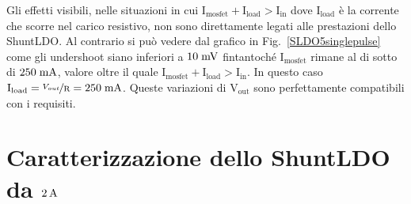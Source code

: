 Gli effetti visibili, nelle situazioni in cui $\mathrm{I_{mosfet} + I_{load} > I_{in}}$ dove $\mathrm{I_{load}}$ è la corrente che scorre nel carico resistivo, non sono direttamente legati alle prestazioni dello ShuntLDO. Al contrario si può vedere dal grafico in Fig.~\ref{SLDO5singlepulse} come gli undershoot siano inferiori a $10\rm \; mV$ fintantoché $\mathrm{I_{mosfet}}$ rimane al di sotto di $250\rm \; mA$, valore oltre il quale $\mathrm{I_{mosfet} + I_{load} > I_{in}}$. In questo caso $\mathrm{I_{load} = \nicefrac{V_{out}}{R} = 250\rm \; mA}$. Queste variazioni di  $\mathrm{V_{out}}$ sono perfettamente compatibili con i requisiti.


\section{Caratterizzazione dello ShuntLDO da $2\rm \, A$}

